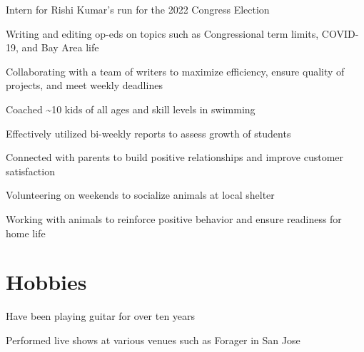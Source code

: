 \documentclass[letterpaper]{resume-shreeram}
\begin{document}
\begin{compactitem}
    \item Intern for Rishi Kumar's run for the 2022 Congress Election

    \item Writing and editing op-eds on topics such as Congressional
      term limits, COVID-19, and Bay Area life

    \item Collaborating with a team of writers to maximize efficiency,
      ensure quality of projects, and meet weekly deadlines
\end{compactitem}

\begin{compactitem}
    \item Coached \textasciitilde{}10 kids of all ages and skill levels
      in swimming

    \item Effectively utilized bi-weekly reports to assess growth of
      students

    \item Connected with parents to build positive relationships and
      improve customer satisfaction
\end{compactitem}

\begin{compactitem}
  \item Volunteering on weekends to socialize animals at local shelter

  \item Working with animals to reinforce positive behavior and ensure
    readiness for home life
\end{compactitem}

\section{Hobbies}

\begin{compactitem}
  \item Have been playing guitar for over ten years

  \item Performed live shows at various venues such as Forager in San
    Jose
\end{compactitem}
\end{document}
